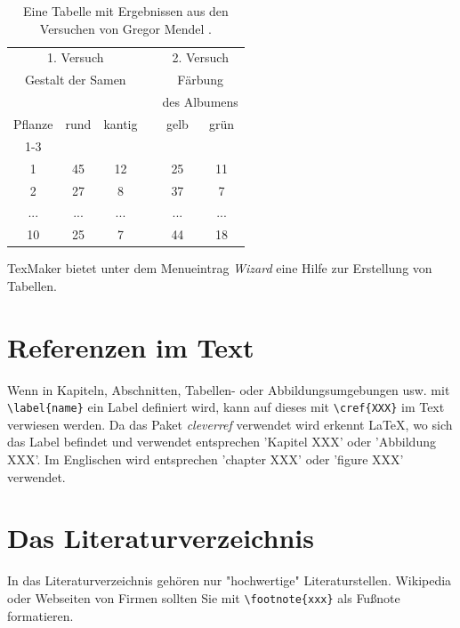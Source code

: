 \begin{table}
\centering
\begin{tabular}{cccccc}
\hline
\multicolumn{3}{c}{1. Versuch} &  & \multicolumn{2}{c}{2. Versuch}\\
\multicolumn{3}{c}{Gestalt der Samen} & & \multicolumn{2}{c}{Färbung }\\
& & & & \multicolumn{2}{c}{des Albumens}\\
Pflanze & rund & kantig &   &  gelb &  grün  \\
\cline{1-3} \cline{5-6} \\
1 & 45 & 12 &   &  25 &  11  \\
2 & 27 & 8 &   &  37 &  7  \\
... & ... & ... &   &  ... &  ...  \\
10 & 25 & 7 &   &  44 &  18  \\
\hline
\end{tabular}
\caption{Eine Tabelle mit Ergebnissen aus den Versuchen von Gregor Mendel \citep{Mendel1866}.}
\label{tab:mendel}
\end{table}

TexMaker bietet unter dem Menueintrag \textit{Wizard} eine Hilfe zur Erstellung von Tabellen. 

\chapter{Referenzen im Text}
\label{cha:refs}
Wenn in Kapiteln, Abschnitten, Tabellen- oder Abbildungsumgebungen usw. mit \verb+\label{name}+ ein Label definiert wird, kann auf dieses mit \verb+\cref{XXX}+ im Text verwiesen werden. Da das Paket \textit{cleverref} verwendet wird erkennt LaTeX, wo sich das Label befindet und verwendet entsprechen 'Kapitel XXX' oder 'Abbildung XXX'. Im Englischen wird entsprechen 'chapter XXX' oder 'figure XXX' verwendet.

	
\chapter{Das Literaturverzeichnis}
\label{cha:bibliography}
In das Literaturverzeichnis gehören nur "hochwertige" Literaturstellen. Wikipedia oder Webseiten von Firmen sollten Sie mit \verb+\footnote{xxx}+ als Fußnote formatieren.

